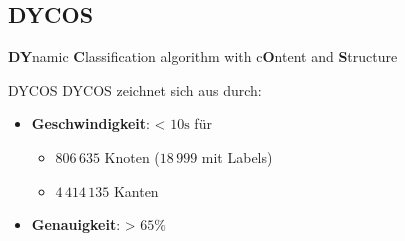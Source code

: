 \subsection{DYCOS}
\begin{frame}{}
    \begin{center}
    \Huge
    \textbf{DY}namic \textbf{C}lassification algorithm with 
    c\textbf{O}ntent and \textbf{S}tructure
    \end{center}
\end{frame}

\begin{frame}{DYCOS}
    DYCOS zeichnet sich aus durch:
    \begin{itemize}
        \item \textbf{Geschwindigkeit}: < $10\si{\second}$ für
            \begin{itemize}
                \item $806\,635$ Knoten ($18\,999$ mit Labels)
                \item $4\,414\,135$ Kanten
            \end{itemize}
        \item \textbf{Genauigkeit}: > $65\%$
    \end{itemize}
\end{frame}




